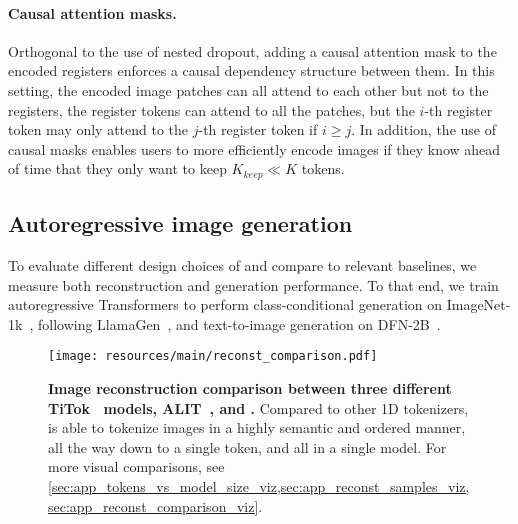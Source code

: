 \paragraph{Causal attention masks.} Orthogonal to the use of nested dropout, adding a causal attention mask to the encoded registers enforces a causal dependency structure between them. In this setting, the encoded image patches can all attend to each other but not to the registers, the register tokens can attend to all the patches, but the $i$-th register token may only attend to the $j$-th register token if $i \geq j$.
In addition, the use of causal masks enables users to more efficiently encode images if they know ahead of time that they only want to keep $K_{keep} \ll K$ tokens.


\subsection{Autoregressive image generation}
To evaluate different design choices of \ours and compare to relevant baselines, we measure both reconstruction and generation performance. To that end, we train autoregressive Transformers to perform class-conditional generation on ImageNet-1k~\cite{Russakovsky2014ImageNet}, following LlamaGen~\cite{sun2024autoregressive}, and text-to-image generation on DFN-2B~\cite{dfn_dataset}. 


\begin{figure*}[ht!]
\centering
\texttt{[image: resources/main/reconst\_comparison.pdf]}
\vspace{-1.5em}
\caption{
\textbf{Image reconstruction comparison between three different TiTok~\cite{yu2024titok} models, ALIT~\cite{Duggal2024ALIT}, and \ours.} Compared to other 1D tokenizers, \ours is able to tokenize images in a highly semantic and ordered manner, all the way down to a single token, and all in a single model. For more visual comparisons, see \cref{sec:app_tokens_vs_model_size_viz,sec:app_reconst_samples_viz,sec:app_reconst_comparison_viz}.
}
\label{fig:reconst_visual_comp}
\end{figure*}
